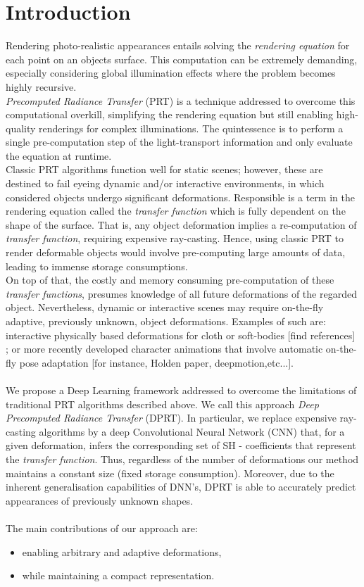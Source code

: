 \section{Introduction}
Rendering photo-realistic appearances entails solving the \textit{rendering equation} for each point on an objects surface. This computation can be extremely demanding, especially considering global illumination effects where the problem becomes highly recursive. \\
\textit{Precomputed Radiance Transfer} (PRT) is a technique addressed to overcome this computational overkill, simplifying the rendering equation but still enabling high-quality renderings for complex illuminations. The quintessence is to perform a single pre-computation step of the light-transport information and only evaluate the equation at runtime.\\
Classic PRT algorithms function well for static scenes; however, these are destined to fail eyeing dynamic and/or interactive environments, in which considered objects undergo significant deformations.
Responsible is a term in the rendering equation called the \textit{transfer function} which is fully dependent on the shape of the surface. That is, any object deformation implies a re-computation of \textit{transfer function},  requiring expensive ray-casting. Hence, using classic PRT to render deformable objects would involve pre-computing large amounts of data, leading to immense storage consumptions. \\
On top of that, the costly and memory consuming pre-computation of these \textit{transfer functions}, presumes knowledge of all future deformations of the regarded object. Nevertheless, dynamic or interactive scenes may require on-the-fly adaptive, previously unknown, object deformations. Examples of such are: 
interactive physically based deformations for cloth or soft-bodies [find references] ; 
or more recently developed character animations that involve automatic on-the-fly pose adaptation [for instance, Holden paper, deepmotion,etc...]. \\
\\
We propose a Deep Learning framework addressed to overcome the limitations of traditional PRT algorithms described above. We call this approach \textit{Deep Precomputed Radiance Transfer} (DPRT). In particular, we replace expensive ray-casting algorithms by a deep Convolutional Neural Network (CNN) that, for a given deformation, infers the corresponding set of SH - coefficients that represent the \textit{transfer function}. 
Thus, regardless of the number of deformations our method maintains a constant size (fixed storage consumption). Moreover, due to the inherent generalisation capabilities of DNN's, DPRT is able to accurately predict appearances of previously unknown shapes. \\
\\
The main contributions of our approach are: 
\begin{itemize}
\item enabling arbitrary and adaptive deformations,
\item while maintaining a compact representation. 
\end{itemize}
